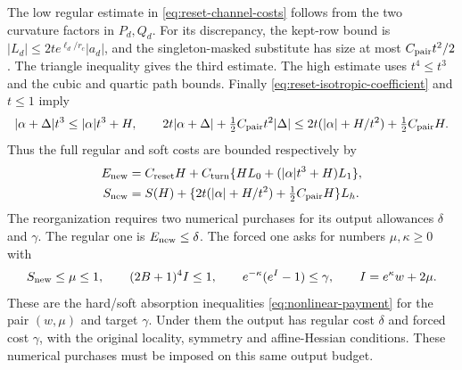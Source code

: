 The low regular estimate in \eqref{eq:reset-channel-costs} follows
from the two curvature factors in $P_d,Q_d$. For its discrepancy,
the kept-row bound is
$|L_d|\le2t e^{\ell_d/r_c}|a_d|$, and the singleton-masked
substitute has size at most $C_{\rm pair}t^2/2$.
The triangle inequality gives the third estimate. The high estimate
uses $t^4\le t^3$ and the cubic and quartic path bounds.
Finally \eqref{eq:reset-isotropic-coefficient} and $t\le1$ imply
\[
 |\alpha+\Delta|t^3\le |\alpha|t^3+H,
 \qquad
 2t|\alpha+\Delta|+\tfrac12C_{\rm pair}t^2|\Delta|
 \le2t(|\alpha|+H/t^2)+\tfrac12C_{\rm pair}H.
\]
Thus the full regular and soft costs are bounded respectively by
\begin{align*}
 E_{\rm new}&=C_{\rm reset}H+
       C_{\rm turn}\{HL_0+(|\alpha|t^3+H)L_1\},\\
 S_{\rm new}&=S(H)+
       \{2t(|\alpha|+H/t^2)+\tfrac12C_{\rm pair}H\}L_h.
\end{align*}
The reorganization requires two numerical purchases for its output
allowances $\delta$ and $\gamma$. The regular one is
$E_{\rm new}\le\delta$. The forced one asks for numbers
$\mu,\kappa\ge0$ with
\begin{equation}\label{eq:reset-forced-purchase}
 S_{\rm new}\le\mu\le1,\qquad
 (2B+1)^4I\le1,\qquad
 e^{-\kappa}(e^{I}-1)\le\gamma,\qquad I=e^\kappa w+2\mu .
\end{equation}
These are the hard/soft absorption inequalities
\eqref{eq:nonlinear-payment} for the pair $(w,\mu)$ and target
$\gamma$. Under them the output has
regular cost $\delta$ and forced cost $\gamma$, with the original
locality, symmetry and affine-Hessian conditions. These numerical
purchases must be imposed on this same output budget.

